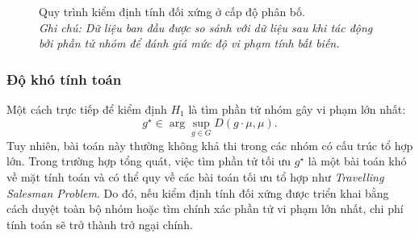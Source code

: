 \begin{figure}[H]
    \centering
    \caption[Quy trình kiểm định tính đối xứng ở cấp độ phân bố]{%
      Quy trình kiểm định tính đối xứng ở cấp độ phân bố.\\[4pt]
      \textit{Ghi chú: Dữ liệu ban đầu được so sánh với dữ liệu sau khi tác động bởi phần tử nhóm để đánh giá mức độ vi phạm tính bất biến.}%
    }
    \label{fig:symmetry-testing-pipeline}
\end{figure}

\subsubsection{Độ khó tính toán}

Một cách trực tiếp để kiểm định $H_1$ là tìm phần tử nhóm gây vi phạm lớn nhất:
\begin{equation}
    g^\star \in \arg\sup_{g \in G} D(g \cdot \mu, \mu).
    \label{eq:symmetry-testing-argmax}
\end{equation}
Tuy nhiên, bài toán này thường không khả thi trong các nhóm có cấu trúc tổ hợp lớn. Trong trường hợp tổng quát, việc tìm phần tử tối ưu $g^\star$ là một bài toán khó về mặt tính toán và có thể quy về các bài toán tối ưu tổ hợp như \textit{Travelling Salesman Problem}. Do đó, nếu kiểm định tính đối xứng được triển khai bằng cách duyệt toàn bộ nhóm hoặc tìm chính xác phần tử vi phạm lớn nhất, chi phí tính toán sẽ trở thành trở ngại chính.

